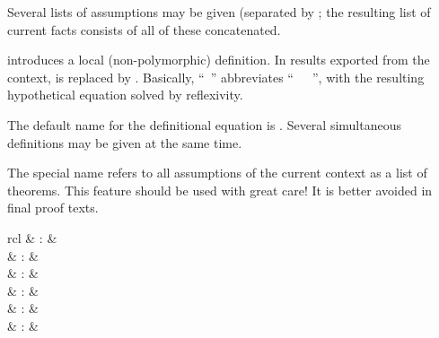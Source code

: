 \begin{isabellebody}
\begin{isamarkuptext}
\begin{descr}
  Several lists of assumptions may be given (separated by
  \mbox{}; the resulting list of current facts consists
  of all of these concatenated.
  
  \item [\mbox{\isa{\isacommand{def}}}~\isa{{\isachardoublequote}x\ {\isasymequiv}\ t{\isachardoublequote}}] introduces a local
  (non-polymorphic) definition.  In results exported from the context,
   is replaced by .  Basically, ``\mbox{}~'' abbreviates ``\mbox{}~~\mbox{}~'', with the resulting
  hypothetical equation solved by reflexivity.
  
  The default name for the definitional equation is .
  Several simultaneous definitions may be given at the same time.

  \end{descr}

  The special name \mbox{} refers to all assumptions of the
  current context as a list of theorems.  This feature should be used
  with great care!  It is better avoided in final proof texts.%
\end{isamarkuptext}%
\isamarkuptrue%
%
\isamarkuptrue%
%
\begin{isamarkuptext}%
\begin{matharray}{rcl}
    \mbox{} & : &  \\
    \mbox{} & : &  \\
    \mbox{} & : &  \\
    \mbox{} & : &  \\
    \mbox{} & : &  \\
    \mbox{} & : &  \\
  \end{matharray}


\end{isamarkuptext}
\end{isabellebody}
